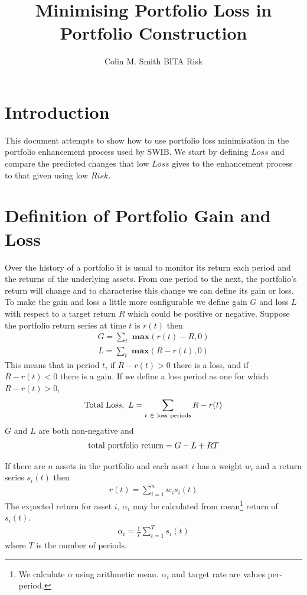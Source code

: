 \documentclass[12pt]{article}
\title{Minimising Portfolio Loss in Portfolio Construction}
\author{Colin M. Smith BITA Risk}
\begin{document}
\maketitle
\tableofcontents
\pagebreak
\doublespacing
\section{Introduction}
This document attempts to show how to use portfolio loss minimisation in the
portfolio enhancement process used by SWIB. We start by defining $Loss$ and compare
the predicted changes that low $Loss$ gives to the enhancement process to that given
using low $Risk$.
\section{Definition of Portfolio Gain and Loss}
Over the history of a portfolio it is usual to monitor its return each period and the returns of the underlying assets.
From one period  to the next, the portfolio's return will change and to characterise this change we can define its gain or loss.
To make the gain and loss a little more configurable we define 
gain $G$ and loss $L$ with respect to a target return $R$ which could be positive or negative.
Suppose the portfolio return series at time $t$ is $r(t)$ then
\begin{eqnarray}
    G = \sum_t {\textbf{ max} }(r(t) - R,0)
\end{eqnarray}
\begin{eqnarray}
    L = \sum_t {\textbf{ max} }(R-r(t),0)
\end{eqnarray}
This means that in period $t$, if $R-r(t) > 0$ there is a loss, and if $R-r(t) < 0$ there is a gain.
If we define a loss period as one for which $R-r(t) > 0$,
\begin{eqnarray}
  {\rm Total\ Loss},\ L= \sum_{t\ \in\ \rm loss\ periods} R-r(t)
\end{eqnarray}
$G$ and $L$ are both non-negative and
\begin{eqnarray}
 {\rm   total\ portfolio\ return}= G - L + RT
\end{eqnarray}

If there are $n$ assets in the portfolio and each asset $i$
has a weight $w_i$ and a return series $s_i (t)$ then
\begin{eqnarray}
    r(t) = \sum_{i=1}^{n} w_i s_i(t)
\end{eqnarray}
The expected return for asset $i$, $\alpha_i$ may be calculated from
mean\footnote{We calculate $\alpha$ using arithmetic mean. $\alpha_i$ and target rate are values per-period.} 
return of $s_i(t)$.
\begin{eqnarray}
    \alpha_i =  \frac{1}{T}\sum_{t=1}^{T} s_i(t)
\end{eqnarray}
where $T$ is the number of periods.
\end{document}
